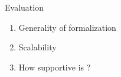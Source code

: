 \begin{frame}{Evaluation}
    \begin{enumerate}
        \item Generality of formalization
        \item Scalability
        \item How supportive is \drivebuild{}?
    \end{enumerate}
\end{frame}

